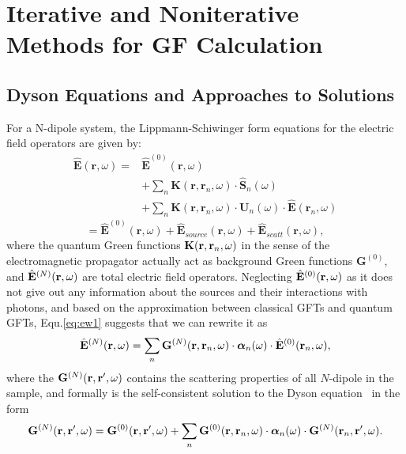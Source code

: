 \chapter[Iterative \& Noniterative Methods]{Iterative and Noniterative Methods for GF Calculation}\label{App:GF}

\section{Dyson Equations and Approaches to Solutions}
For a N-dipole system, the Lippmann-Schiwinger form equations for the electric field operators are given by\cite{Wubs2004}:
%
\begin{subequations}
\label{eq:ew1}
\begin{align}
\mathbf{\hat{E}}(\mathbf{r},\omega) =& \mathbf{\hat{E}}^{(0)}(\mathbf{r},\omega)\label{bareE0}\\
&+ \sum_n{\mathbf{K}(\mathbf{r},\mathbf{r}_n,\omega)\cdot\hat{\mathbf{S}}_n(\omega)}\label{sourceE}\\
&+ \sum_n{\mathbf{K}(\mathbf{r},\mathbf{r}_n,\omega)\cdot\mathbf{U}_n(\omega)\cdot\mathbf{\hat{E}}(\mathbf{r}_n,\omega)}\label{scatteringE}
\end{align}
\end{subequations}
%
\begin{equation}
 =\mathbf{\hat{E}}^{(0)}(\mathbf{r},\omega)+ \mathbf{\hat{E}}_{source}(\mathbf{r},\omega)+\mathbf{\hat{E}}_{scatt}(\mathbf{r},\omega)\label{eq:E0sourcescatt},
\end{equation}
where the quantum Green functions $\mathbf{K}(\mathbf{r},\mathbf{r}_n,\omega)$ in the sense of the electromagnetic propagator actually act as background Green functions $\mathbf{G}^{(0)}$, and $\hat{\mathbf{E}}^{(N)}(\mathbf{r},\omega)$ are total electric field operators.
Neglecting $\E0$ as it does not give out any information about the sources and their interactions with photons, and based on the approximation between classical GFTs and quantum GFTs, Equ.\eqref{eq:ew1} suggests that
we can rewrite it as
\begin{align}
 \Erw=\sum_n{\GN(\rrn,\omega)\cdot \Alphanw \cdot \Enw0},  \label{E4GNS_app}
\end{align}
where the $\mathbf{G}^{(N)}(\mathbf{r},\mathbf{r}',\omega)$ contains the scattering properties
of all $N$-dipole in the sample, and formally is the self-consistent solution to the Dyson equation~\cite{Martin1998} in the form
\begin{equation}
 \label{dysonGN}
\mathbf{G}^{(N)}(\mathbf{r},\mathbf{r}',\omega)=\mathbf{G}^{(0)}(\mathbf{r},\mathbf{r}',\omega)+\sum_n{\mathbf{G}^{(0)}(\mathbf{r},\mathbf{r}_n,\omega)\cdot {\bm \alpha}_n(\omega) \cdot \mathbf{G}^{(N)}(\mathbf{r}_n,\mathbf{r}',\omega)}.
\end{equation}

